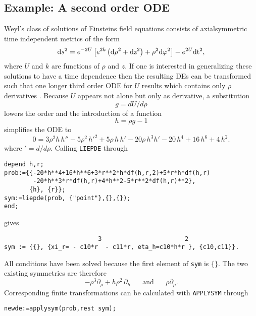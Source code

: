 \documentclass[12pt]{article}
\begin{document}
\subsection{Example: A second order ODE}
Weyl's class of solutions of Einsteins field equations consists of
axialsymmetric time independent metrics of the form
\begin{equation}
{\rm{d}} s^2 = e^{-2 U} \left[ e^{2 k}  \left( \rm{d} \rho^2 + \rm{d}
z^2 \right)+\rho^2 \rm{d} \varphi^2 \right] - e^{2 U} \rm{d} t^2,
\end{equation}
where $U$ and $k$ are functions of $\rho$ and $z$. If one is interested in
generalizing these solutions to have a time dependence then the resulting
DEs can be transformed such that one longer third order ODE for $U$ results
which contains only $\rho$ derivatives \cite{Markus}. Because $U$ appears
not alone but only as derivative, a substitution
\begin{equation}
g = dU/d\rho      \label{g1dgl}
\end{equation}
lowers the order and the introduction of a function
\begin{equation}
h = \rho g - 1    \label{g2dgl}
\end{equation}
simplifies the ODE to
\begin{equation}
0 = 3\rho^2h\,h''
-5\rho^2\,h'^2+5\rho\,h\,h'-20\rho\,h^3h'-20\,h^4+16\,h^6+4\,h^2. \label{hdgl}
\end{equation}
where $'= d/d\rho$.
Calling {\tt LIEPDE} through
\small \begin{verbatim}
depend h,r;
prob:={{-20*h**4+16*h**6+3*r**2*h*df(h,r,2)+5*r*h*df(h,r)
        -20*h**3*r*df(h,r)+4*h**2-5*r**2*df(h,r)**2},
       {h}, {r}};
sym:=liepde(prob, {"point"},{},{});
end; \end{verbatim} \normalsize
gives \small \begin{verbatim}
                          3                       2
sym := {{}, {xi_r= - c10*r  - c11*r, eta_h=c10*h*r }, {c10,c11}}.
\end{verbatim} \normalsize
All conditions have been solved because the first element of {\tt sym}
is $\{\}$. The two existing symmetries are therefore
\begin{equation}
  - \rho^3 \partial_{\rho} +  h \rho^2 \,\partial_{h} \;\;\;\;\;\;\mbox{and}
  \;\;\;\;\;\;\rho \partial_{\rho}.
\end{equation}
Corresponding finite
transformations can be calculated with {\tt APPLYSYM} through
\small \begin{verbatim}
newde:=applysym(prob,rest sym);
\end{verbatim} \normalsize
\end{document}
